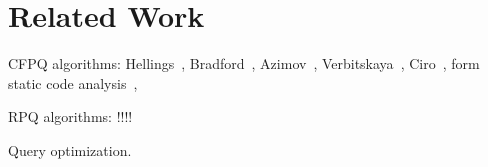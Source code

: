 \section{Related Work}

CFPQ algorithms: Hellings~\cite{!!!}, Bradford~\cite{!!!}, Azimov~\cite{!!!}, Verbitskaya~\cite{!!!}, Ciro~\cite{!!!}, form static code analysis~\cite{!!!}, 

RPQ algorithms: !!!!~\cite{!!!}

Query optimization.